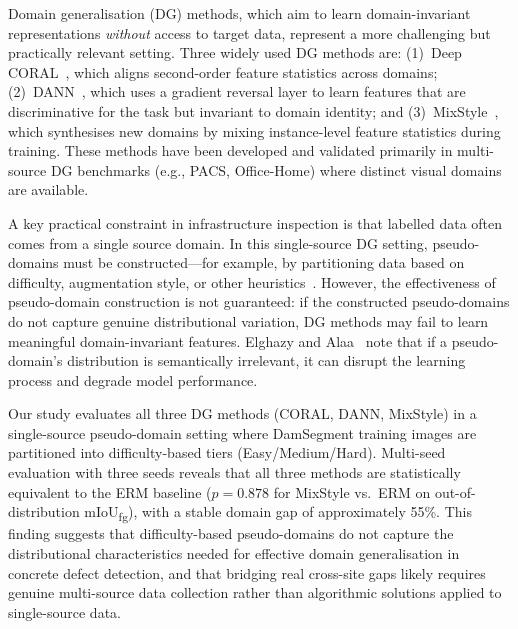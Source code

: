 \documentclass[preprint,12pt]{elsarticle}
\begin{document}
Domain generalisation (DG) methods, which aim to learn domain-invariant representations \emph{without} access to target data, represent a more challenging but practically relevant setting. Three widely used DG methods are: (1)~Deep CORAL~\cite{sun2016coral}, which aligns second-order feature statistics across domains; (2)~DANN~\cite{ganin2016dann}, which uses a gradient reversal layer to learn features that are discriminative for the task but invariant to domain identity; and (3)~MixStyle~\cite{zhou2021mixstyle, zhou2023mixstyle}, which synthesises new domains by mixing instance-level feature statistics during training. These methods have been developed and validated primarily in multi-source DG benchmarks (e.g., PACS, Office-Home) where distinct visual domains are available.

A key practical constraint in infrastructure inspection is that labelled data often comes from a single source domain. In this single-source DG setting, pseudo-domains must be constructed---for example, by partitioning data based on difficulty, augmentation style, or other heuristics~\cite{elghazy2025pseudodg}. However, the effectiveness of pseudo-domain construction is not guaranteed: if the constructed pseudo-domains do not capture genuine distributional variation, DG methods may fail to learn meaningful domain-invariant features. Elghazy and Alaa~\cite{elghazy2025pseudodg} note that if a pseudo-domain's distribution is semantically irrelevant, it can disrupt the learning process and degrade model performance.

Our study evaluates all three DG methods (CORAL, DANN, MixStyle) in a single-source pseudo-domain setting where DamSegment training images are partitioned into difficulty-based tiers (Easy/Medium/Hard). Multi-seed evaluation with three seeds reveals that all three methods are statistically equivalent to the ERM baseline ($p=0.878$ for MixStyle vs.\ ERM on out-of-distribution mIoU\textsubscript{fg}), with a stable domain gap of approximately 55\%. This finding suggests that difficulty-based pseudo-domains do not capture the distributional characteristics needed for effective domain generalisation in concrete defect detection, and that bridging real cross-site gaps likely requires genuine multi-source data collection rather than algorithmic solutions applied to single-source data.


\end{document}
